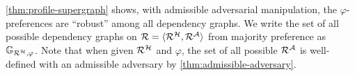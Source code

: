 \cref{thm:profile-supergraph} shows, with admissible adversarial manipulation, the $\varphi$-preferences are ``robust'' among all dependency graphs.
%
We write the set of all possible dependency graphs on $\mathcal{R} = \langle \mathcal{R}^\mathcal{H}, \mathcal{R}^\mathcal{A} \rangle$ from majority preference as $\mathbb{G}_{\mathcal{R}^\mathcal{H}, \varphi}$.
%
Note that when given $\mathcal{R}^\mathcal{H}$ and $\varphi$, the set of all possible $\mathcal{R}^\mathcal{A}$ is well-defined with an admissible adversary by \cref{thm:admissible-adversary}.
